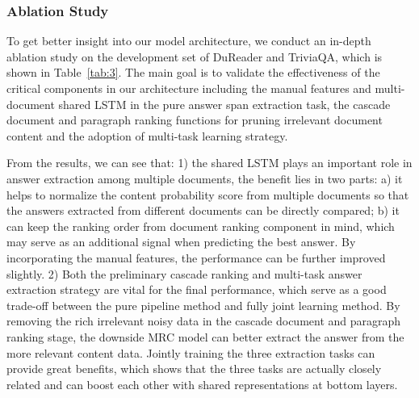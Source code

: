 \documentclass[letterpaper]{article} \usepackage{aaai19}  \usepackage{graphicx}
\begin{document}
\subsubsection{Ablation Study}
To get better insight into our model architecture, we conduct an in-depth ablation study on the development set of DuReader and TriviaQA, which is shown in Table~\ref{tab:3}. The main goal is to validate the effectiveness of the critical components in our architecture including the manual features and multi-document shared LSTM in the pure answer span extraction task, the cascade document and paragraph ranking functions for pruning irrelevant document content and the adoption of multi-task learning strategy.

From the results, we can see that: 1) the shared LSTM plays an important role in answer extraction among multiple documents, the benefit lies in two parts: a) it helps to normalize the content probability score from multiple documents so that the answers extracted from different documents can be directly compared; b) it can keep the ranking order from document ranking component in mind, which may serve as an additional signal when predicting the best answer. By incorporating the manual features, the performance can be further improved slightly. 2) Both the preliminary cascade ranking and multi-task answer extraction strategy are vital for the final performance, which serve as a good trade-off between the pure pipeline method and fully joint learning method. By removing the rich irrelevant noisy data in the cascade document and paragraph ranking stage, the downside MRC model can better extract the       answer from the more relevant content data. Jointly training the three extraction tasks can provide great benefits, which shows that the three tasks are actually closely related and can boost each other with shared representations at bottom layers.
\end{document}
